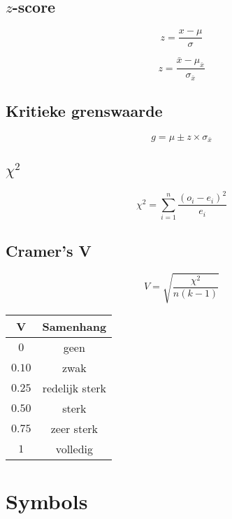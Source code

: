 \documentclass[a4paper]{article}
\begin{document}
\subsection{$z$-score}

\begin{equation}
z = \frac{x- \mu}{\sigma}
\end{equation}

\begin{equation}
z = \frac{\bar{x} - \mu_{\bar{x}}}{\sigma_{\bar{x}}}
\end{equation}

\subsection{Kritieke grenswaarde}

\begin{equation}
g = \mu \pm z \times \sigma_{\bar{x}}
\end{equation}

\subsection{$\chi^2$}

\begin{equation}
\chi^2 = \sum_{i=1}^{n} \frac{(o_i - e_i)^2}{e_i}
\end{equation}

\subsection{Cramer's V}

\begin{equation}
V = \sqrt{\frac{\chi^2}{n(k - 1)}}
\end{equation}

\begin{tabular}{c|c}
V & Samenhang \\ \hline
$0$ & geen \\ \hline
$0.10$ & zwak \\ \hline
$0.25$ & redelijk sterk \\ \hline
$0.50$ & sterk \\ \hline
$0.75$ & zeer sterk \\ \hline
$1$ & volledig \\
\end{tabular}

\section{Symbols}
\end{document}
